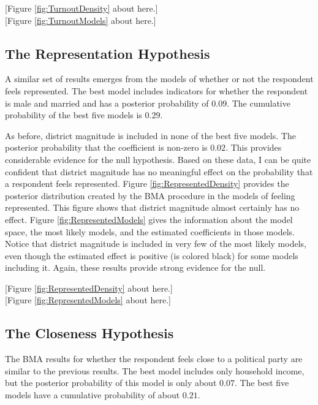 \documentclass[12pt]{article}
\begin{document}
\begin{center}
[Figure \ref{fig:TurnoutDensity} about here.]\\

[Figure \ref{fig:TurnoutModels} about here.]
\end{center}

\subsection*{The Representation Hypothesis}

A similar set of results emerges from the models of whether or not the respondent feels represented. The best model includes indicators for whether the respondent is male and married and has a posterior probability of $0.09$. The cumulative probability of the best five models is $0.29$. 

As before, district magnitude is included in none of the best five models. The posterior probability that the coefficient is non-zero is $0.02$. This provides considerable evidence for the null hypothesis. Based on these data, I can be quite confident that district magnitude has no meaningful effect on the probability that a respondent feels represented. Figure \ref{fig:RepresentedDensity} provides the posterior distribution created by the BMA procedure in the models of feeling represented. This figure shows that district magnitude almost certainly has no effect. Figure \ref{fig:RepresentedModels} gives the information about the model space, the most likely models, and the estimated coefficients in those models. Notice that district magnitude is included in very few of the most likely models, even though the estimated effect is positive (is colored black) for some models including it. Again, these results provide strong evidence for the null. 

\begin{center}
[Figure \ref{fig:RepresentedDensity} about here.]\\

[Figure \ref{fig:RepresentedModels} about here.]
\end{center}

\subsection*{The Closeness Hypothesis}

The BMA results for whether the respondent feels close to a political party are similar to the previous results. The best model includes only household income, but the posterior probability of this model is only about $0.07$. The best five models have a cumulative probability of about $0.21$.
\end{document}
